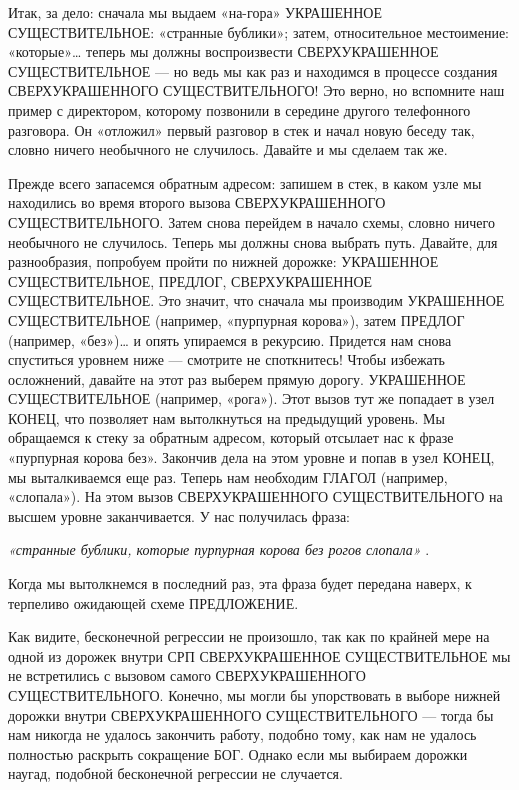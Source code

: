 Итак, за дело: сначала мы выдаем «на-гора» УКРАШЕННОЕ СУЩЕСТВИТЕЛЬНОЕ: «странные бублики»; затем, относительное местоимение: «которые»\ldots{} теперь мы должны воспроизвести СВЕРХУКРАШЕННОЕ СУЩЕСТВИТЕЛЬНОЕ --- но ведь мы как раз и находимся в процессе создания СВЕРХУКРАШЕННОГО СУЩЕСТВИТЕЛЬНОГО! Это верно, но вспомните наш пример с директором, которому позвонили в середине другого телефонного разговора. Он «отложил» первый разговор в стек и начал новую беседу так, словно ничего необычного не случилось. Давайте и мы сделаем так же.

Прежде всего запасемся обратным адресом: запишем в стек, в каком узле мы находились во время второго вызова СВЕРХУКРАШЕННОГО СУЩЕСТВИТЕЛЬНОГО. Затем снова перейдем в начало схемы, словно ничего необычного не случилось. Теперь мы должны снова выбрать путь. Давайте, для разнообразия, попробуем пройти по нижней дорожке: УКРАШЕННОЕ СУЩЕСТВИТЕЛЬНОЕ, ПРЕДЛОГ, СВЕРХУКРАШЕННОЕ СУЩЕСТВИТЕЛЬНОЕ. Это значит, что сначала мы производим УКРАШЕННОЕ СУЩЕСТВИТЕЛЬНОЕ (например, «пурпурная корова»), затем ПРЕДЛОГ (например, «без»)\ldots{} и опять упираемся в рекурсию. Придется нам снова спуститься уровнем ниже --- смотрите не споткнитесь! Чтобы избежать осложнений, давайте на этот раз выберем прямую дорогу. УКРАШЕННОЕ СУЩЕСТВИТЕЛЬНОЕ (например, «рога»). Этот вызов тут же попадает в узел КОНЕЦ, что позволяет нам вытолкнуться на предыдущий уровень. Мы обращаемся к стеку за обратным адресом, который отсылает нас к фразе «пурпурная корова без». Закончив дела на этом уровне и попав в узел КОНЕЦ, мы выталкиваемся еще раз. Теперь нам необходим ГЛАГОЛ (например, «слопала»). На этом вызов СВЕРХУКРАШЕННОГО СУЩЕСТВИТЕЛЬНОГО на высшем уровне заканчивается. У нас получилась фраза:

\emph{«странные бублики, которые пурпурная корова без рогов слопала»} .

Когда мы вытолкнемся в последний раз, эта фраза будет передана наверх, к терпеливо ожидающей схеме ПРЕДЛОЖЕНИЕ.

Как видите, бесконечной регрессии не произошло, так как по крайней мере на одной из дорожек внутри СРП СВЕРХУКРАШЕННОЕ СУЩЕСТВИТЕЛЬНОЕ мы не встретились с вызовом самого СВЕРХУКРАШЕННОГО СУЩЕСТВИТЕЛЬНОГО. Конечно, мы могли бы упорствовать в выборе нижней дорожки внутри СВЕРХУКРАШЕННОГО СУЩЕСТВИТЕЛЬНОГО --- тогда бы нам никогда не удалось закончить работу, подобно тому, как нам не удалось полностью раскрыть сокращение БОГ. Однако если мы выбираем дорожки наугад, подобной бесконечной регрессии не случается.

